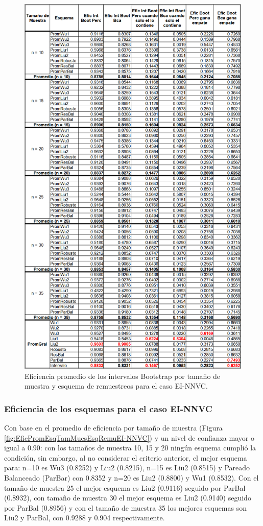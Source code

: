 \begin{figure}[ht] 
	\centering 
	\includegraphics[width=0.55\linewidth]{img/EI_NNVC_Efic_Boots.png} 
	\caption{Eficiencia promedio de los intervalos Bootstrap por tamaño de muestra y esquema de remuestreos para el caso EI-NNVC.} 
	\label{fig:EficPromIntBootsTamMuestEsqRemuEI-NNVC}
\end{figure}
\FloatBarrier

\subsubsection{Eficiencia de los esquemas para el caso EI-NNVC}
Con base en el promedio de eficiencia por tamaño de muestra (Figura \ref{fig:EficPromEsqTamMuesEsqRemuEI-NNVC})  y un nivel de confianza mayor o igual a 0.90: con los tamaños de muestra 10, 15 y 20 ningún esquema cumplió la condición, sin embargo, al no considerar el criterio anterior, el mejor esquema para: n=10 es Wu3 (0.8252) y Liu2 (0.8215), n=15 es Liu2 (0.8515) y Pareado Balanceado (ParBar) con 0.8352 y n=20 es Liu2 (0.8800) y Wu1 (0.8532). Con el tamaño de muestra 25 el mejor esquema es Liu2 (0.9116) seguido por ParBal (0.8932), con tamaño de muestra 30 el mejor esquema es Liu2 (0.9140) seguido por ParBal (0.8956) y con el tamaño de muestra 35 los mejores esquemas son Liu2 y ParBal, con 0.9288 y 0.904 respectivamente.
\vspace{.5cm}

